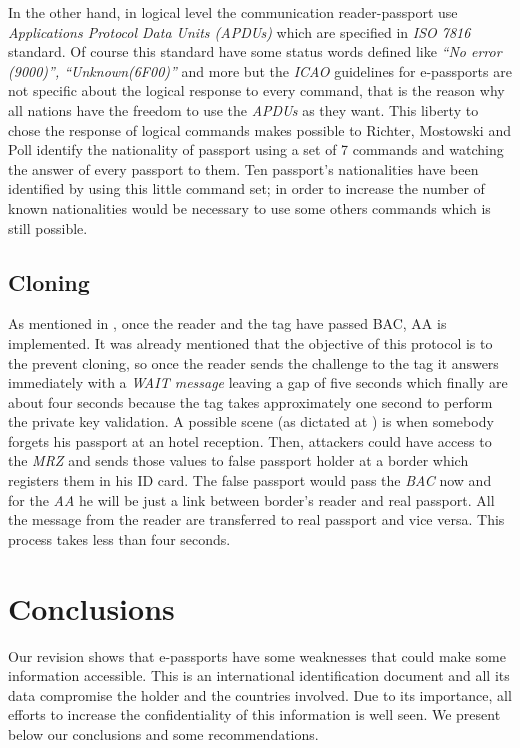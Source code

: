 \documentclass{acm_proc_article-sp}
\begin{document}
In the other hand, in logical level the communication reader-passport use \textit{Applications Protocol 
Data Units (APDUs)} which are specified in \textit{ISO 7816} standard. Of course this standard have some status 
words defined like \textit{“No error (9000)”, “Unknown(6F00)”} and more but the \textit{ICAO} guidelines for 
e-passports are not specific about the logical response to every command, that is the reason why 
all nations have the freedom to use the \textit{APDUs} as they want. This liberty to chose the response of 
logical commands makes possible to Richter, Mostowski and Poll \cite{03HENN} identify the nationality of 
passport using a set of 7 commands and watching the answer of every passport to them. Ten passport's 
nationalities have been identified by using this little command set; in order to increase the number of 
known nationalities would be necessary to use some others commands which is still possible.


\subsection{Cloning}
As mentioned in \cite{MHTR07}, once the reader and the tag have passed BAC, AA is implemented. 
It was already mentioned that the objective of this protocol is to the prevent cloning, 
so once the reader sends the challenge to the tag it answers immediately with a 
\emph{WAIT message} leaving a gap of five seconds which finally are about four seconds because the 
tag takes approximately one second to perform the private key validation. 
A possible scene (as dictated at \cite{MHTR07}) is when somebody forgets his passport at an hotel reception. Then, attackers could have access to the \emph{MRZ} and sends those values to false passport holder at a border which registers them in his ID card. The false passport would pass the \emph{BAC} now  and for the \emph{AA} he will be just a link between border's reader and real passport. All the message from the reader are transferred to real passport and vice versa. This process takes less than four seconds.

\section{Conclusions}
\label{sec:sec4}
Our revision shows that e-passports have some weaknesses that could make some information accessible. This is an international identification document and all its data compromise the holder and the countries involved. Due to its importance, all efforts to increase the confidentiality of this information is well seen. We present below our conclusions and some recommendations.
\end{document}
